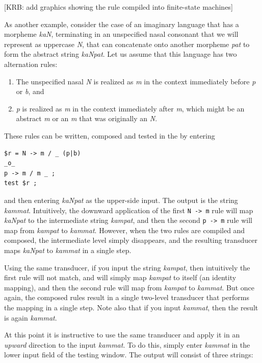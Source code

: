 [KRB:  add graphics showing the rule compiled into finite-state
machines]

As another example, consider the case of an imaginary language that has a
morpheme \emph{kaN}, terminating in an unspecified nasal consonant that we will
represent as uppercase \emph{N}, that can concatenate onto another morpheme
\emph{pat} to form the abstract string \emph{kaNpat}.  Let us assume that this language
has two alternation rules:

\begin{enumerate}
\item
The unspecified nasal \emph{N} is realized as \emph{m} in the context immediately before \emph{p} or
\emph{b}, and
\item
\emph{p} is realized as \emph{m} in the context immediately after \emph{m}, which might be an abstract
\emph{m} or an \emph{m} that was originally an \emph{N}.
\end{enumerate}

\noindent
These rules can be written, composed and tested in the  by entering


\begin{Verbatim}
$r = N -> m / _ (p|b)
_o_
p -> m / m _ ;
test $r ;
\end{Verbatim}

\noindent
and then entering \emph{kaNpat} as the upper-side input.  The output is the string
\emph{kammat}.  Intuitively, the downward application of the first \texttt{N ->
m} rule will map \emph{kaNpat} to the intermediate string \emph{kampat}, and then
the second \texttt{p -> m} rule will map from \emph{kampat} to \emph{kammat}.
However, when the two rules are compiled and composed, the
intermediate level simply disappears, and the resulting transducer maps \emph{kaNpat} to
\emph{kammat} in a single step.

Using the same transducer, if
you input the string \emph{kampat}, then intuitively the first rule will not match, and
will simply map \emph{kampat} to itself (an identity mapping), and then the second
rule will map from \emph{kampat} to \emph{kammat}.  But once again, the composed
rules result in a single two-level transducer that performs the mapping in a
single step.  Note also that if you input \emph{kammat}, then the result is again
\emph{kammat}.

At this point it is instructive to use the same transducer and apply it in an
\emph{upward} direction to the input \emph{kammat}.  To do this, simply enter
\emph{kammat} in the lower input field of the testing window.  The output will
consist of three strings:

